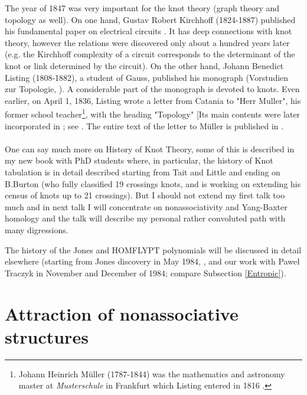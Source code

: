 \documentclass[12pt]{amsart}
\begin{document}
   The year of 1847 was very important for the knot theory
(graph theory and topology as well).
On one hand,  Gustav Robert Kirchhoff (1824-1887)
published his fundamental paper on electrical circuits \cite{Kir}.
It has deep connections with knot theory,
however the relations were discovered only about
a hundred years later (e.g. the Kirchhoff complexity of a circuit corresponds
to the determinant of the knot or link determined by the circuit).
On the other hand, Johann Benedict Listing (1808-1882), a student of Gauss,
published his monograph (Vorstudien zur Topologie, \cite{Lis}).
A considerable part
of the monograph is devoted to knots. Even earlier, on April 1, 1836,
 Listing wrote a letter from Catania to "Herr Muller", his former school
teacher\footnote{Johann Heinrich M\"uller (1787-1844) was the mathematics
and astronomy master at {\it Musterschule} in Frankfurt which Listing entered in 1816
\cite{Bre1,Bre2}.}, with the heading
"Topology" [Its main contents were later incorporated in \cite{Lis}; see \cite{Bre2}. The entire text of the letter to M\"uller is published in \cite{Bre1}.
\ \\ \ \\

One can say much more on History of Knot Theory, some of this is described in my new book with PhD students \cite{PBIMW} where, in particular, the history of Knot tabulation is in detail described starting from Tait and Little and ending on B.Burton (who fully classified 19 crossings knots, and is working on extending his census of knots  up to 21 crossings). 
But I should not extend my first talk too much and in next talk I will concentrate on nonassociativity and Yang-Baxter homology and the talk will describe my personal rather convoluted  path with many digressions. 

The history of the Jones and HOMFLYPT polynomials will be discussed in detail elsewhere (starting from Jones discovery in May 1984, \cite{Jon1}, and our work with Pawe{\l} Traczyk in November and December of 1984; compare Subsection \ref{Entropic}).

\section{Attraction of nonassociative structures}\label{Attraction}
\end{document}
